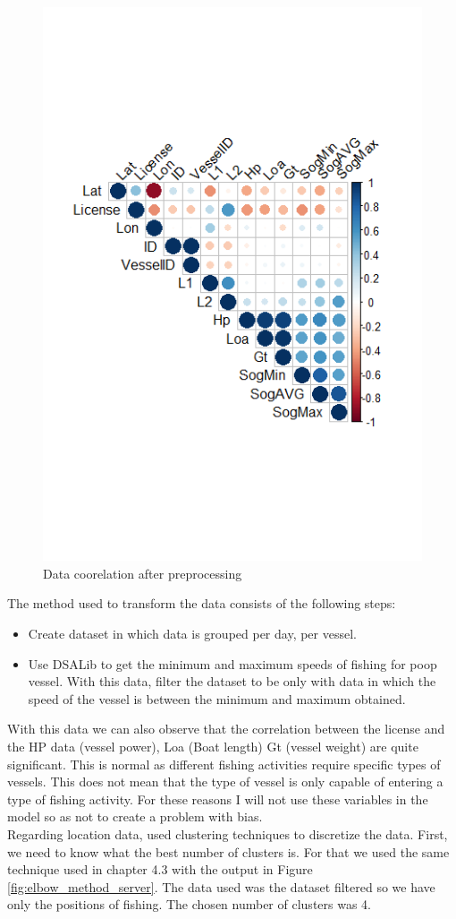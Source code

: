 \begin{figure}[H]
    \centering
    \includegraphics[width=0.8\linewidth]{Chapters/img/data_coor2.png}
    \caption{Data coorelation after preprocessing}
    \label{fig:data_coor2}
\end{figure}

The method used to transform the data consists of the following steps:
\begin{itemize}
\item	Create dataset in which data is grouped per day, per vessel.
\item	Use DSALib to get the minimum and maximum speeds of fishing for poop vessel. With this data, filter the dataset to be only with data in which the speed of the vessel is between the minimum and maximum obtained.

\end{itemize}

With this data we can also observe that the correlation between the license and the HP data (vessel power), Loa (Boat length) Gt (vessel weight) are quite significant. This is normal as different fishing activities require specific types of vessels. This does not mean that the type of vessel is only capable of entering a type of fishing activity.
For these reasons I will not use these variables in the model so as not to create a problem with bias.
\\
Regarding location data, used clustering techniques to discretize the data.
First, we need to know what the best number of clusters is. For that we used the same technique used in chapter 4.3 with the output in Figure \ref{fig:elbow_method_server}. The data used was the dataset filtered so we have only the positions of fishing. The chosen number of clusters was 4.


